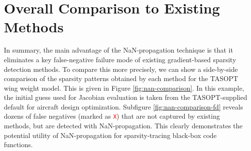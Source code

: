 \section{Overall Comparison to Existing Methods}
\label{sec:nan-comparison}

In summary, the main advantage of the NaN-propagation technique is that it eliminates a key false-negative failure mode of existing gradient-based sparsity detection methods. To compare this more precisely, we can show a side-by-side comparison of the sparsity patterns obtained by each method for the TASOPT wing weight model. This is given in Figure \ref{fig:nan-comparison}. In this example, the initial guess used for Jacobian evaluation is taken from the TASOPT-supplied default for aircraft design optimization. Subfigure \ref{fig:nan-comparison-fd} reveals dozens of false negatives (marked as \textcolor{red}{\texttt{X}}) that are not captured by existing methods, but are detected with NaN-propagation. This clearly demonstrates the potential utility of NaN-propagation for sparsity-tracing black-box code functions.

